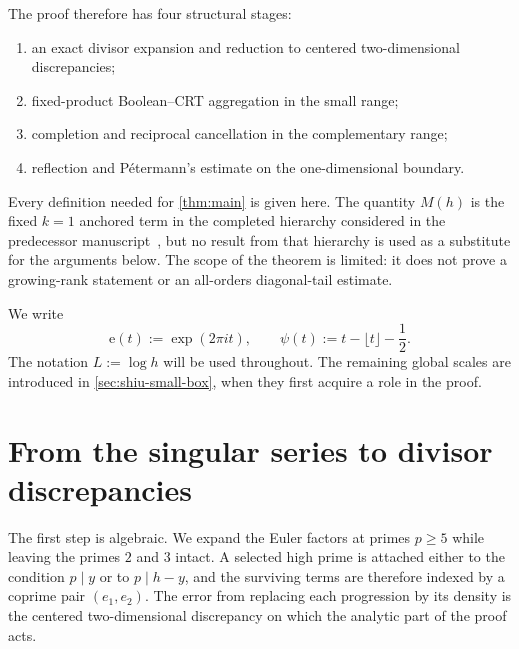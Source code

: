 \documentclass[11pt]{article}
\theoremstyle{definition}
\theoremstyle{remark}
\newcommand{\e}{\mathrm e}
\newcommand{\1}{\mathbf 1}
\begin{document}
The proof therefore has four structural stages:
\begin{enumerate}
\item an exact divisor expansion and reduction to centered two-dimensional discrepancies;
\item fixed-product Boolean--CRT aggregation in the small range;
\item completion and reciprocal cancellation in the complementary range;
\item reflection and P\'etermann's estimate on the one-dimensional boundary.
\end{enumerate}
Every definition needed for \cref{thm:main} is given here.  The quantity $M(h)$ is the fixed $k=1$ anchored term in the completed hierarchy considered in the predecessor manuscript~\cite{DorseySecondLayer2026}, but no result from that hierarchy is used as a substitute for the arguments below.  The scope of the theorem is limited: it does not prove a growing-rank statement or an all-orders diagonal-tail estimate.

We write
\begin{equation}\label{eq:e-psi}
\e(t):=\exp(2\pi i t),
\qquad
\psi(t):=t-\lfloor t\rfloor-\frac12.
\end{equation}
The notation $L:=\log h$ will be used throughout.  The remaining global scales are introduced in \cref{sec:shiu-small-box}, when they first acquire a role in the proof.

\section{From the singular series to divisor discrepancies}\label{sec:exact-expansion}

The first step is algebraic.  We expand the Euler factors at primes $p\ge5$ while leaving the primes $2$ and $3$ intact.  A selected high prime is attached either to the condition $p\mid y$ or to $p\mid h-y$, and the surviving terms are therefore indexed by a coprime pair $(e_1,e_2)$.  The error from replacing each progression by its density is the centered two-dimensional discrepancy on which the analytic part of the proof acts.
\end{document}
